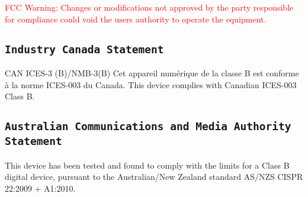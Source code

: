 \textcolor{red}{FCC Warning:}
\textcolor{red}{Changes or modifications not approved by the party responsible for compliance could void the users authority to operate the equipment.}


\subsection{\texttt{Industry Canada Statement}}
CAN ICES-3 (B)/NMB-3(B)
Cet appareil numérique de la classe B est conforme à la norme ICES-003
du Canada. This device complies with Canadian ICES-003 Class B.

\subsection{\texttt{Australian Communications and Media Authority Statement}}
This device has been tested and found to comply with the limits for a
Class B digital device, pursuant to the Australian/New Zealand standard AS/NZS CISPR 22:2009 + A1:2010.
